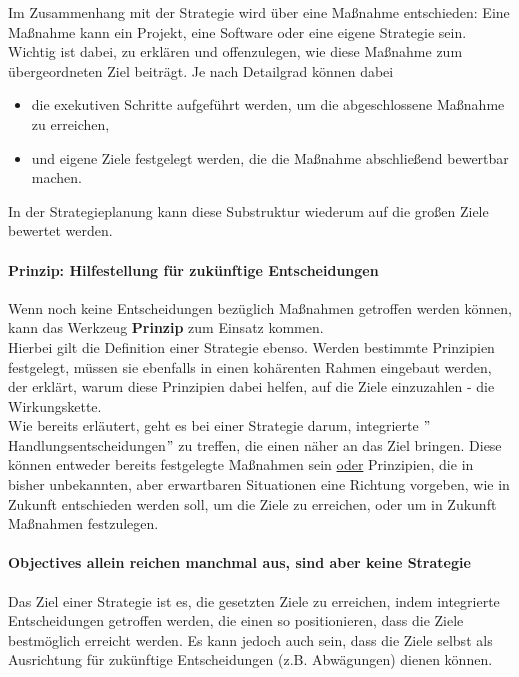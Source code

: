 Im Zusammenhang mit der Strategie wird über eine Maßnahme entschieden: Eine Maßnahme kann ein Projekt, eine Software oder eine eigene Strategie sein. Wichtig ist dabei, zu erklären und offenzulegen, wie diese Maßnahme zum übergeordneten Ziel beiträgt. Je nach Detailgrad können dabei

\begin{itemize}
	\item die exekutiven Schritte aufgeführt werden, um die abgeschlossene Maßnahme zu erreichen,
	\item und eigene Ziele festgelegt werden, die die Maßnahme abschließend bewertbar machen.
\end{itemize}

In der Strategieplanung kann diese Substruktur wiederum auf die großen Ziele bewertet werden.

\paragraph{Prinzip: Hilfestellung für zukünftige Entscheidungen}

Wenn noch keine Entscheidungen bezüglich Maßnahmen getroffen werden können, kann das Werkzeug \textbf{Prinzip} zum Einsatz kommen.\\

Hierbei gilt die Definition einer Strategie ebenso. Werden bestimmte Prinzipien festgelegt, müssen sie ebenfalls in einen kohärenten Rahmen eingebaut werden, der erklärt, warum diese Prinzipien dabei helfen, auf die Ziele einzuzahlen - die Wirkungskette.\\

Wie bereits erläutert, geht es bei einer Strategie darum, integrierte $"$Handlungsentscheidungen$"$ zu treffen, die einen näher an das Ziel bringen. Diese können entweder bereits festgelegte Maßnahmen sein \underline{oder} Prinzipien, die in bisher unbekannten, aber erwartbaren Situationen eine Richtung vorgeben, wie in Zukunft entschieden werden soll, um die Ziele zu erreichen, oder um in Zukunft Maßnahmen festzulegen.

\paragraph{Objectives allein reichen manchmal aus, sind aber keine Strategie}

Das Ziel einer Strategie ist es, die gesetzten Ziele zu erreichen, indem integrierte Entscheidungen getroffen werden, die einen so positionieren, dass die Ziele bestmöglich erreicht werden. Es kann jedoch auch sein, dass die Ziele selbst als Ausrichtung für zukünftige Entscheidungen (z.B. Abwägungen) dienen können.\\

